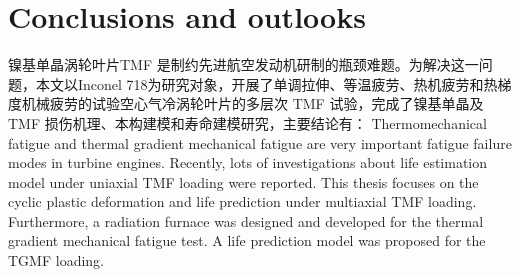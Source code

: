 \chapter{Conclusions and outlooks}
\noindent
镍基单晶涡轮叶片TMF 是制约先进航空发动机研制的瓶颈难题。为解决这一问题，本文以Inconel 718为研究对象，开展了单调拉伸、等温疲劳、热机疲劳和热梯度机械疲劳的试验空心气冷涡轮叶片的多层次
TMF 试验，完成了镍基单晶及TMF 损伤机理、本构建模和寿命建模研究，主要结论有：
Thermomechanical fatigue and thermal gradient mechanical fatigue are very important fatigue failure modes in turbine engines.
Recently, lots of investigations about life estimation model under uniaxial TMF loading were reported. This thesis focuses on the cyclic plastic deformation and life prediction under multiaxial TMF loading. Furthermore, a radiation furnace was designed and developed for the thermal gradient mechanical fatigue test. A life prediction model was proposed for the TGMF loading.

